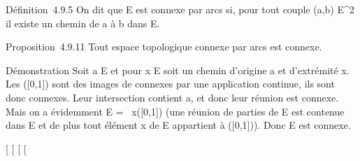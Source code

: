 Définition~4.9.5 On dit que E est connexe par arcs si, pour tout couple
(a,b) \in E^2 il existe un chemin de a à b dans E.

Proposition~4.9.11 Tout espace topologique connexe par arcs est connexe.

Démonstration Soit a \in E et pour x \in E soit \gammax un chemin
d'origine a et d'extrémité x. Les \gammax({[}0,1{]}) sont des
images de connexes par une application continue, ils sont donc connexes.
Leur intersection contient a, et donc leur réunion est connexe. Mais on
a évidemment E =\ \⋃
 x\inE\gammax({[}0,1{]}) (une réunion de parties de E est
contenue dans E et de plus tout élément x de E appartient à
\gammax({[}0,1{]})). Donc E est connexe.

{[}
{[}
{[}
{[}
